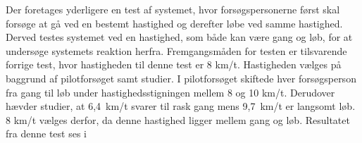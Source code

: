 Der foretages yderligere en test af systemet, hvor forsøgspersonerne først skal forsøge at gå ved en bestemt hastighed og derefter løbe ved samme hastighed. Derved testes systemet ved en hastighed, som både kan være gang og løb, for at undersøge systemets reaktion herfra. Fremgangsmåden for testen er tilsvarende forrige test, hvor hastigheden til denne test er 8 km/t. Hastigheden vælges på baggrund af pilotforsøget samt studier. I pilotforsøget skiftede hver forsøgsperson fra gang til løb under hastighedsstigningen mellem 8 og 10 km/t. Derudover hævder studier, at 6,4~km/t svarer til rask gang mens 9,7~km/t er langsomt løb. 8 km/t vælges derfor, da denne hastighed ligger mellem gang og løb. \citep{Miles2007} Resultatet fra denne test ses i 
\begin{table}[H]
	\centering
\end{table}
